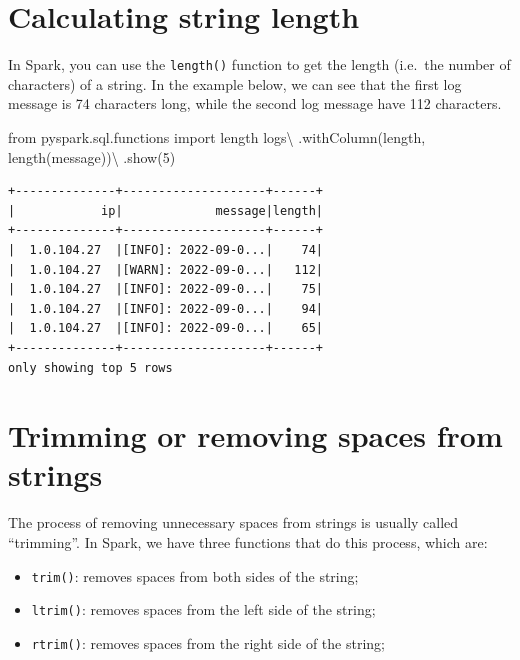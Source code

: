 \documentclass[
  11pt,
  letterpaper,
  DIV=11,
  numbers=noendperiod]{scrreprt}
\newenvironment{Shaded}{\begin{snugshade}}{\end{snugshade}}
\newcommand{\DecValTok}[1]{\textcolor[rgb]{0.68,0.00,0.00}{#1}}
\newcommand{\ImportTok}[1]{\textcolor[rgb]{0.00,0.46,0.62}{#1}}
\newcommand{\NormalTok}[1]{\textcolor[rgb]{0.00,0.23,0.31}{#1}}
\newcommand{\OperatorTok}[1]{\textcolor[rgb]{0.37,0.37,0.37}{#1}}
\newcommand{\StringTok}[1]{\textcolor[rgb]{0.13,0.47,0.30}{#1}}
\providecommand{\tightlist}{%
  \setlength{\itemsep}{0pt}\setlength{\parskip}{0pt}}\usepackage{longtable,booktabs,array}
\begin{document}
\section{Calculating string length}\label{calculating-string-length}

In Spark, you can use the \texttt{length()} function to get the length
(i.e.~the number of characters) of a string. In the example below, we
can see that the first log message is 74 characters long, while the
second log message have 112 characters.

\begin{Shaded}
\begin{Highlighting}[]
\ImportTok{from}\NormalTok{ pyspark.sql.functions }\ImportTok{import}\NormalTok{ length}
\NormalTok{logs}\OperatorTok{\textbackslash{}}
\NormalTok{    .withColumn(}\StringTok{\textquotesingle{}length\textquotesingle{}}\NormalTok{, length(}\StringTok{\textquotesingle{}message\textquotesingle{}}\NormalTok{))}\OperatorTok{\textbackslash{}}
\NormalTok{    .show(}\DecValTok{5}\NormalTok{)}
\end{Highlighting}
\end{Shaded}

\begin{verbatim}
+--------------+--------------------+------+
|            ip|             message|length|
+--------------+--------------------+------+
|  1.0.104.27  |[INFO]: 2022-09-0...|    74|
|  1.0.104.27  |[WARN]: 2022-09-0...|   112|
|  1.0.104.27  |[INFO]: 2022-09-0...|    75|
|  1.0.104.27  |[INFO]: 2022-09-0...|    94|
|  1.0.104.27  |[INFO]: 2022-09-0...|    65|
+--------------+--------------------+------+
only showing top 5 rows
\end{verbatim}

\section{Trimming or removing spaces from
strings}\label{trimming-or-removing-spaces-from-strings}

The process of removing unnecessary spaces from strings is usually
called ``trimming''. In Spark, we have three functions that do this
process, which are:

\begin{itemize}
\tightlist
\item
  \texttt{trim()}: removes spaces from both sides of the string;
\item
  \texttt{ltrim()}: removes spaces from the left side of the string;
\item
  \texttt{rtrim()}: removes spaces from the right side of the string;
\end{itemize}
\end{document}
